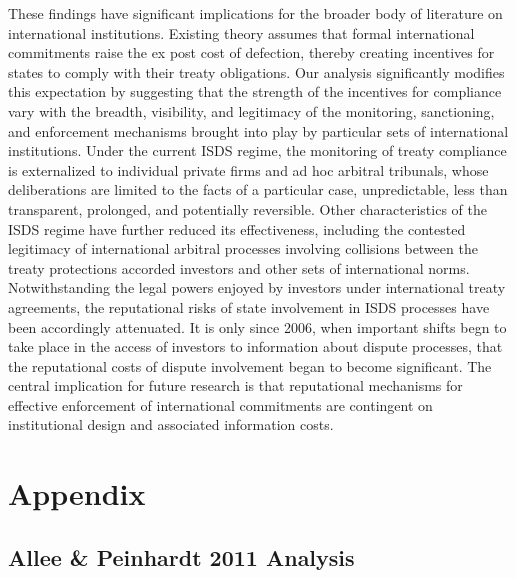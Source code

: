 \documentclass[12pt,onesided]{amsart}
\begin{document}
These findings have significant implications for the broader body of literature on international institutions. Existing theory assumes that formal international commitments raise the ex post cost of defection, thereby creating incentives for states to comply with their treaty obligations. Our analysis significantly modifies this expectation by suggesting that the strength of the incentives for compliance vary with the breadth, visibility, and legitimacy of the monitoring, sanctioning, and enforcement mechanisms brought into play by particular sets of international institutions. Under the current ISDS regime, the monitoring of treaty compliance is externalized to individual private firms and ad hoc arbitral tribunals, whose deliberations are limited to the facts of a particular case, unpredictable, less than transparent, prolonged, and potentially reversible. Other characteristics of the ISDS regime have further reduced its effectiveness, including the contested legitimacy of international arbitral processes involving collisions between the treaty protections accorded investors and other sets of international norms. Notwithstanding the legal powers enjoyed by investors under international treaty agreements, the reputational risks of state involvement in ISDS processes have been accordingly attenuated. It is only since 2006, when important shifts begn to take place in the access of investors to information about dispute processes, that the reputational costs of dispute involvement began to become significant. The central implication for future research is that reputational mechanisms for effective enforcement of international commitments are contingent on institutional design and associated information costs.


\newpage






\newpage

\section*{Appendix}
\label{appendix}

\appendix
\setcounter{figure}{0} \renewcommand{\thefigure}{A.\arabic{figure}}
\setcounter{table}{0} \renewcommand{\thetable}{A.\arabic{table}}

\subsection*{Allee \& Peinhardt 2011 Analysis}
\end{document}
